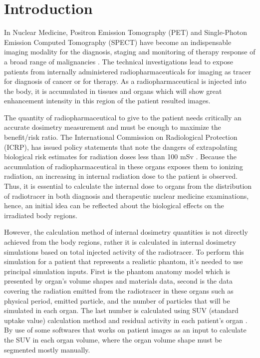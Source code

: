 \documentclass[letterpaper,12pt]{article}
\begin{document}
\section{Introduction}

In Nuclear Medicine, Positron Emission Tomography (PET) and Single-Photon Emission Computed Tomography (SPECT) have become an indispensable imaging modality for the diagnosis, staging and monitoring of therapy response of a broad range of malignancies \cite{AAAA, BBBB}. The technical investigations lead to expose patients from internally administered radiopharmaceuticals for imaging as tracer for diagnosis of cancer or for therapy. As a radiopharmaceutical is injected into the body, it is accumulated in tissues and organs which will show great enhancement intensity in this region of the patient resulted images.

The quantity of radiopharmaceutical to give to the patient needs critically an accurate dosimetry measurement and must be enough to maximize the benefit/risk ratio. The International Commission on Radiological Protection (ICRP), has issued policy statements that note the dangers of extrapolating biological risk estimates for radiation doses less than 100 mSv \cite{ICRP103}. Because the accumulation of radiopharmaceutical in these organs exposes them to ionizing radiation, an increasing in internal radiation dose to the patient is observed. Thus, it is essential to calculate the internal dose to organs from the distribution of radiotracer in both diagnosis and therapeutic nuclear medicine examinations, hence, an initial idea can be reflected about the biological effects on the irradiated body regions.

However, the calculation method of internal dosimetry quantities is not directly achieved from the body regions, rather it is calculated in internal dosimetry simulations based on total injected activity of the radiotracer. To perform this simulation for a patient that represents a realistic phantom, it's needed to use principal simulation inputs. First is the phantom anatomy model which is presented by organ's volume shapes and materials data, second is the data covering the radiation emitted from the radiotracer in these organs such as physical period, emitted particle, and the number of particles that will be simulated in each organ. The last number is calculated using SUV (standard uptake value) calculation method and residual activity in each patient's organ \cite{SUV}. By use of some softwares that works on patient images as an input to calculate the SUV in each organ volume, where the organ volume shape must be segmented mostly manually. 
\end{document}
